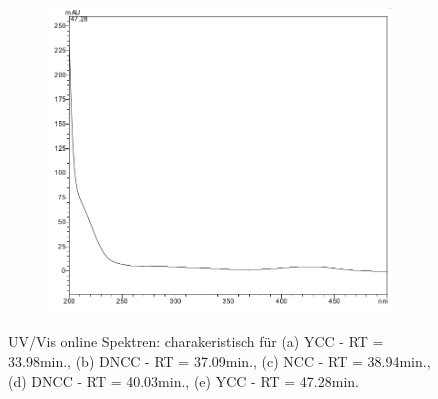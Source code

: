 \begin{figure}[!htbp]
  \begin{subfigure}[b]{0.5\textwidth}
    \includegraphics[width=\textwidth]{figures/Kapitel6/Reaktion3h/YCC4728.png}
    \caption{}
    \label{fig:YCC4728}
  \end{subfigure}
  \caption[UV/Vis online Spektren mit der Charakteristik eines YCC bei 33.98min., eines DNCC bei 37.09min. eines NCC bei 38.94min., eines DNCC bei 40.03min. sowie eines YCC bei 47.28min., Quelle: Author]{UV/Vis online Spektren: charakeristisch für (a) \gls{YCC} - RT = 33.98min., (b) \gls{DNCC} - RT = 37.09min., (c) \gls{NCC} - RT = 38.94min., (d) \gls{DNCC} - RT = 40.03min., (e) \gls{YCC} - RT = 47.28min.}
\end{figure}

